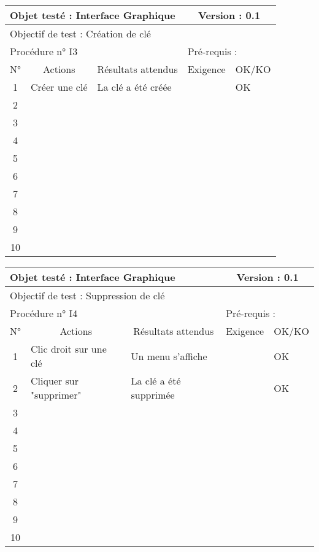 \documentclass{../res/univ-projet}
\begin{document}
\begin{center}
    \begin{tabular}{|c|p{5cm}|p{5cm}|p{1.5cm}|p{1.5cm}|}
      \hline
      \multicolumn{3}{|l|}{Objet testé : Interface Graphique} & \multicolumn{2}{c|}{Version : 0.1}\\ \hline
      \multicolumn{5}{|l|}{Objectif de test : Création de clé}\\ \hline
      \multicolumn{3}{|l|}{Procédure n° I3} & \multicolumn{2}{p{3cm}|}{Pré-requis : }\\ \hline
      \multicolumn{1}{|c|}{N°} & \multicolumn{1}{c|}{Actions} & \multicolumn{1}{c|}{Résultats attendus} & 
      \multicolumn{1}{c|}{Exigence} & \multicolumn{1}{c|}{OK/KO}\\ \hline
      1 & Créer une clé & La clé a été créée &  & OK \\
      2 &  &  &  & \\
      3 &  &  &  & \\ 
      4 &  &  &  & \\
      5 &  &  &  & \\
      6 &  &  &  & \\
      7 &  &  &  & \\
      8 &  &  &  & \\
      9 &  &  &  & \\
      10 &  &  &  &\\ 
	\hline
    \end{tabular}
    \vskip 2.2cm

    \begin{tabular}{|c|p{5cm}|p{5cm}|p{1.5cm}|p{1.5cm}|}
      \hline
      \multicolumn{3}{|l|}{Objet testé : Interface Graphique} & \multicolumn{2}{c|}{Version : 0.1}\\ \hline
      \multicolumn{5}{|l|}{Objectif de test : Suppression de clé}\\ \hline
      \multicolumn{3}{|l|}{Procédure n° I4} & \multicolumn{2}{p{3cm}|}{Pré-requis : }\\ \hline
      \multicolumn{1}{|c|}{N°} & \multicolumn{1}{c|}{Actions} & \multicolumn{1}{c|}{Résultats attendus} & 
      \multicolumn{1}{c|}{Exigence} & \multicolumn{1}{c|}{OK/KO}\\ \hline
      1 & Clic droit sur une clé & Un menu s'affiche &  & OK \\
      2 & Cliquer sur "supprimer" & La clé a été supprimée & & OK \\
      3 &  &  &  & \\ 
      4 &  &  &  & \\
      5 &  &  &  & \\
      6 &  &  &  & \\
      7 &  &  &  & \\
      8 &  &  &  & \\
      9 &  &  &  & \\
      10 &  &  &  &\\ 
	\hline
    \end{tabular}
    \vskip 2.2cm


\end{center}
\end{document}

